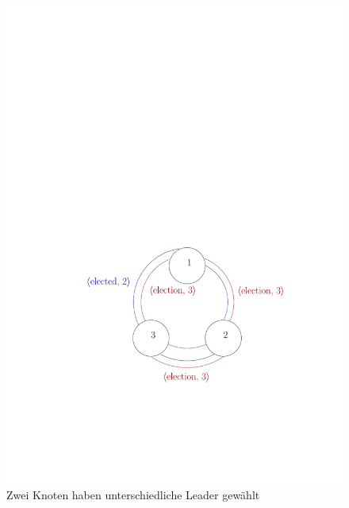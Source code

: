 \begin{figure}
  \begin{center}
    \includegraphics{./pics/9_1_3}
  \end{center}
  \caption{Zwei Knoten haben unterschiedliche Leader gewählt}
  \label{fig:9_1_3}
\end{figure}
